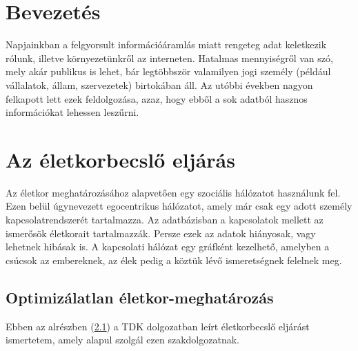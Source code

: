 \documentclass[12pt]{article}
\begin{document}
\section{Bevezetés}
Napjainkban a felgyorsult információáramlás miatt rengeteg adat keletkezik rólunk, illetve környezetünkről az interneten. %
Hatalmas mennyiségről van szó, mely akár publikus is lehet, bár legtöbbször valamilyen jogi személy (például vállalatok, állam, szervezetek) birtokában áll. Az utóbbi években nagyon felkapott lett ezek feldolgozása, azaz, hogy ebből a sok adatból hasznos információkat lehessen leszűrni.


\section{Az életkorbecslő eljárás} %
Az életkor meghatározásához alapvetően egy szociális hálózatot használunk fel. Ezen belül úgynevezett egocentrikus hálózatot, amely már csak egy adott személy kapcsolatrendszerét tartalmazza. Az adatbázisban a kapcsolatok mellett az ismerősök életkorait tartalmazzák. Persze ezek az adatok hiányosak, vagy lehetnek hibásak is. A kapcsolati hálózat egy gráfként kezelhető, amelyben a csúcsok az embereknek, az élek pedig a köztük lévő ismeretségnek felelnek meg.

\subsection{Optimizálatlan életkor-meghatározás} \label{eletkor_becsles_tamas_gabor}
Ebben az alrészben (\ref{eletkor_becsles_tamas_gabor}) a \cite{tamas_gabor_tdk} TDK dolgozatban leírt életkorbecslő eljárást ismertetem, amely alapul szolgál ezen szakdolgozatnak.
\end{document}
